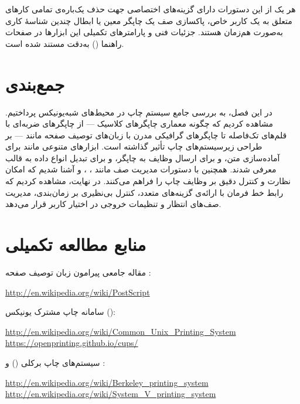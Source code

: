 هر یک از این دستورات دارای گزینه‌های اختصاصی جهت حذف یک‌باره‌ی تمامی کارهای متعلق به یک کاربر خاص، پاکسازی صف یک چاپگر معین یا ابطال چندین شناسهٔ کاری به‌صورت هم‌زمان هستند. جزئیات فنی و پارامترهای تکمیلی این ابزارها در صفحات راهنما () به‌دقت مستند شده است.

\section{جمع‌بندی}

در این فصل، به بررسی جامع سیستم چاپ در محیط‌های شبه‌یونیکس پرداختیم. مشاهده کردیم که چگونه معماری چاپگرهای کلاسیک — از چاپگرهای ضربه‌ای با قلم‌های تک‌فاصله تا چاپگرهای گرافیکی مدرن با زبان‌های توصیف صفحه مانند  — بر طراحی زیرسیستم‌های چاپ تأثیر گذاشته است. ابزارهای متنوعی مانند  برای آماده‌سازی متن،  و  برای ارسال وظایف به چاپگر، و  برای تبدیل انواع داده به قالب  معرفی شدند. همچنین با دستورات مدیریت صف مانند ، ،  و  آشنا شدیم که امکان نظارت و کنترل دقیق بر وظایف چاپ را فراهم می‌کنند. در نهایت، مشاهده کردیم که رابط خط فرمان با ارائه‌ی گزینه‌های متعدد، کنترل بی‌نظیری بر زمان‌بندی، مدیریت صف‌های انتظار و تنظیمات خروجی در اختیار کاربر قرار می‌دهد.

\section{منابع مطالعه تکمیلی}

مقاله جامعی پیرامون زبان توصیف صفحه :

\begin{latin}
\url{http://en.wikipedia.org/wiki/PostScript}
\end{latin}

سامانه چاپ مشترک یونیکس ():

\begin{latin}
\url{http://en.wikipedia.org/wiki/Common_Unix_Printing_System}\\
\url{https://openprinting.github.io/cups/}
\end{latin}

سیستم‌های چاپ برکلی () و :

\begin{latin}
\url{http://en.wikipedia.org/wiki/Berkeley_printing_system}\\
\url{http://en.wikipedia.org/wiki/System_V_printing_system}
\end{latin}